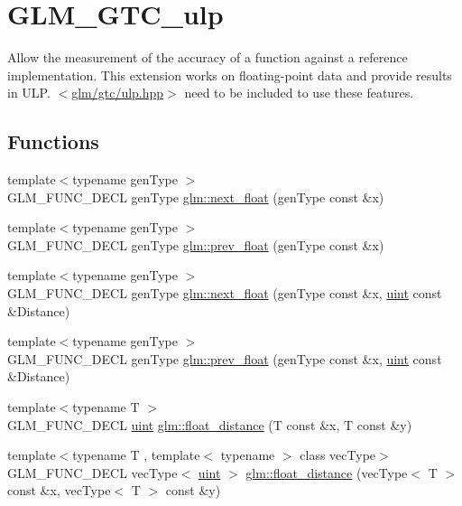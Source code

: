 \hypertarget{group__gtc__ulp}{}\section{G\+L\+M\+\_\+\+G\+T\+C\+\_\+ulp}
\label{group__gtc__ulp}


Allow the measurement of the accuracy of a function against a reference implementation. This extension works on floating-\/point data and provide results in U\+L\+P. $<$\hyperlink{ulp_8hpp}{glm/gtc/ulp.\+hpp}$>$ need to be included to use these features.  


\subsection*{Functions}
\begin{DoxyCompactItemize}
\item 
{\footnotesize template$<$typename gen\+Type $>$ }\\G\+L\+M\+\_\+\+F\+U\+N\+C\+\_\+\+D\+E\+C\+L gen\+Type \hyperlink{group__gtc__ulp_gae516ae554faa6117660828240e8bdaf0}{glm\+::next\+\_\+float} (gen\+Type const \&x)
\item 
{\footnotesize template$<$typename gen\+Type $>$ }\\G\+L\+M\+\_\+\+F\+U\+N\+C\+\_\+\+D\+E\+C\+L gen\+Type \hyperlink{group__gtc__ulp_ga2fcbb7bfbfc595712bfddc51b0715b07}{glm\+::prev\+\_\+float} (gen\+Type const \&x)
\item 
{\footnotesize template$<$typename gen\+Type $>$ }\\G\+L\+M\+\_\+\+F\+U\+N\+C\+\_\+\+D\+E\+C\+L gen\+Type \hyperlink{group__gtc__ulp_gad107ec3d9697ef82032a33338a73ebdd}{glm\+::next\+\_\+float} (gen\+Type const \&x, \hyperlink{stb__image_8c_a91ad9478d81a7aaf2593e8d9c3d06a14}{uint} const \&Distance)
\item 
{\footnotesize template$<$typename gen\+Type $>$ }\\G\+L\+M\+\_\+\+F\+U\+N\+C\+\_\+\+D\+E\+C\+L gen\+Type \hyperlink{group__gtc__ulp_gaa399d5b6472a70e8952f9b26ecaacdec}{glm\+::prev\+\_\+float} (gen\+Type const \&x, \hyperlink{stb__image_8c_a91ad9478d81a7aaf2593e8d9c3d06a14}{uint} const \&Distance)
\item 
{\footnotesize template$<$typename T $>$ }\\G\+L\+M\+\_\+\+F\+U\+N\+C\+\_\+\+D\+E\+C\+L \hyperlink{stb__image_8c_a91ad9478d81a7aaf2593e8d9c3d06a14}{uint} \hyperlink{group__gtc__ulp_ga2e09bd6c8b0a9c91f6f5683d68245634}{glm\+::float\+\_\+distance} (T const \&x, T const \&y)
\item 
{\footnotesize template$<$typename T , template$<$ typename $>$ class vec\+Type$>$ }\\G\+L\+M\+\_\+\+F\+U\+N\+C\+\_\+\+D\+E\+C\+L vec\+Type$<$ \hyperlink{stb__image_8c_a91ad9478d81a7aaf2593e8d9c3d06a14}{uint} $>$ \hyperlink{group__gtc__ulp_ga85355f2549d75789eb66e5d565d8ad26}{glm\+::float\+\_\+distance} (vec\+Type$<$ T $>$ const \&x, vec\+Type$<$ T $>$ const \&y)
\end{DoxyCompactItemize}


